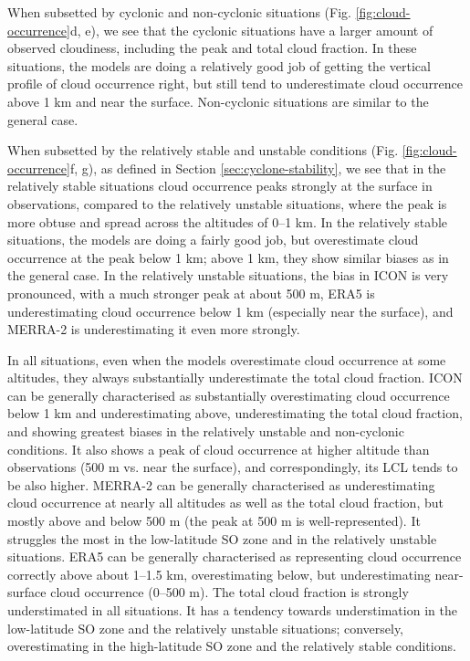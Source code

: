 \documentclass[12pt,a4paper]{article}
\begin{document}
When subsetted by cyclonic and non-cyclonic situations (Fig.
\ref{fig:cloud-occurrence}d, e), we see that the cyclonic situations have a
larger amount of observed cloudiness, including the peak and total cloud
fraction. In these situations, the models are doing a relatively good job of
getting the vertical profile of cloud occurrence right, but still tend to
underestimate cloud occurrence above 1 km and near the surface. Non-cyclonic
situations are similar to the general case.

When subsetted by the relatively stable and unstable conditions (Fig.
\ref{fig:cloud-occurrence}f, g), as defined in Section
\ref{sec:cyclone-stability}, we see that in the relatively stable
situations cloud occurrence peaks strongly at the surface in observations,
compared to the relatively unstable situations, where the peak is more obtuse
and spread across the altitudes of 0--1 km.  In the relatively stable
situations, the models are doing a fairly good job, but overestimate cloud
occurrence at the peak below 1 km; above 1 km, they show similar biases as in
the general case.  In the relatively unstable situations, the bias in ICON is
very pronounced, with a much stronger peak at about 500 m, ERA5 is
underestimating cloud occurrence below 1 km (especially near the surface), and
MERRA-2 is underestimating it even more strongly.

In all situations, even when the models overestimate cloud occurrence at some
altitudes, they always substantially underestimate the total cloud fraction.
ICON can be generally characterised as substantially overestimating cloud
occurrence below 1 km and underestimating above, underestimating the total
cloud fraction, and showing greatest biases in the relatively unstable and
non-cyclonic conditions. It also shows a peak of cloud occurrence at higher
altitude than observations (500 m vs. near the surface), and correspondingly,
its LCL tends to be also higher. MERRA-2 can be generally characterised as
underestimating cloud occurrence at nearly all altitudes as well as the total
cloud fraction, but mostly above and below 500 m (the peak at 500 m is
well-represented). It struggles the most in the low-latitude SO zone and in the
relatively unstable situations. ERA5 can be generally characterised as
representing cloud occurrence correctly above about 1--1.5 km, overestimating
below, but underestimating near-surface cloud occurrence (0--500 m). The total
cloud fraction is strongly understimated in all situations. It has a tendency
towards understimation in the low-latitude SO zone and the relatively unstable
situations; conversely, overestimating in the high-latitude SO zone and the
relatively stable conditions.
\end{document}

